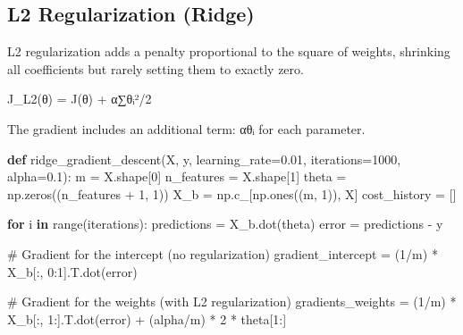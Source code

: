 \documentclass[
  letterpaper,
  DIV=11,
  numbers=noendperiod]{scrreprt}
\newenvironment{Shaded}{\begin{snugshade}}{\end{snugshade}}
\newcommand{\BuiltInTok}[1]{\textcolor[rgb]{0.00,0.23,0.31}{#1}}
\newcommand{\CommentTok}[1]{\textcolor[rgb]{0.37,0.37,0.37}{#1}}
\newcommand{\ControlFlowTok}[1]{\textcolor[rgb]{0.00,0.23,0.31}{\textbf{#1}}}
\newcommand{\DecValTok}[1]{\textcolor[rgb]{0.68,0.00,0.00}{#1}}
\newcommand{\FloatTok}[1]{\textcolor[rgb]{0.68,0.00,0.00}{#1}}
\newcommand{\KeywordTok}[1]{\textcolor[rgb]{0.00,0.23,0.31}{\textbf{#1}}}
\newcommand{\NormalTok}[1]{\textcolor[rgb]{0.00,0.23,0.31}{#1}}
\newcommand{\OperatorTok}[1]{\textcolor[rgb]{0.37,0.37,0.37}{#1}}
\begin{document}
\subsection{L2 Regularization (Ridge)}\label{l2-regularization-ridge}

L2 regularization adds a penalty proportional to the square of weights,
shrinking all coefficients but rarely setting them to exactly zero.

J\_L2(θ) = J(θ) + α∑θᵢ²/2

The gradient includes an additional term: αθᵢ for each parameter.

\begin{Shaded}
\begin{Highlighting}[]
\KeywordTok{def}\NormalTok{ ridge\_gradient\_descent(X, y, learning\_rate}\OperatorTok{=}\FloatTok{0.01}\NormalTok{, iterations}\OperatorTok{=}\DecValTok{1000}\NormalTok{, alpha}\OperatorTok{=}\FloatTok{0.1}\NormalTok{):}
\NormalTok{    m }\OperatorTok{=}\NormalTok{ X.shape[}\DecValTok{0}\NormalTok{]}
\NormalTok{    n\_features }\OperatorTok{=}\NormalTok{ X.shape[}\DecValTok{1}\NormalTok{]}
\NormalTok{    theta }\OperatorTok{=}\NormalTok{ np.zeros((n\_features }\OperatorTok{+} \DecValTok{1}\NormalTok{, }\DecValTok{1}\NormalTok{))}
\NormalTok{    X\_b }\OperatorTok{=}\NormalTok{ np.c\_[np.ones((m, }\DecValTok{1}\NormalTok{)), X]}
\NormalTok{    cost\_history }\OperatorTok{=}\NormalTok{ []}
    
    \ControlFlowTok{for}\NormalTok{ i }\KeywordTok{in} \BuiltInTok{range}\NormalTok{(iterations):}
\NormalTok{        predictions }\OperatorTok{=}\NormalTok{ X\_b.dot(theta)}
\NormalTok{        error }\OperatorTok{=}\NormalTok{ predictions }\OperatorTok{{-}}\NormalTok{ y}
        
        \CommentTok{\# Gradient for the intercept (no regularization)}
\NormalTok{        gradient\_intercept }\OperatorTok{=}\NormalTok{ (}\DecValTok{1}\OperatorTok{/}\NormalTok{m) }\OperatorTok{*}\NormalTok{ X\_b[:, }\DecValTok{0}\NormalTok{:}\DecValTok{1}\NormalTok{].T.dot(error)}
        
        \CommentTok{\# Gradient for the weights (with L2 regularization)}
\NormalTok{        gradients\_weights }\OperatorTok{=}\NormalTok{ (}\DecValTok{1}\OperatorTok{/}\NormalTok{m) }\OperatorTok{*}\NormalTok{ X\_b[:, }\DecValTok{1}\NormalTok{:].T.dot(error) }\OperatorTok{+}\NormalTok{ (alpha}\OperatorTok{/}\NormalTok{m) }\OperatorTok{*} \DecValTok{2} \OperatorTok{*}\NormalTok{ theta[}\DecValTok{1}\NormalTok{:]}
        

\end{Highlighting}
\end{Shaded}
\end{document}
